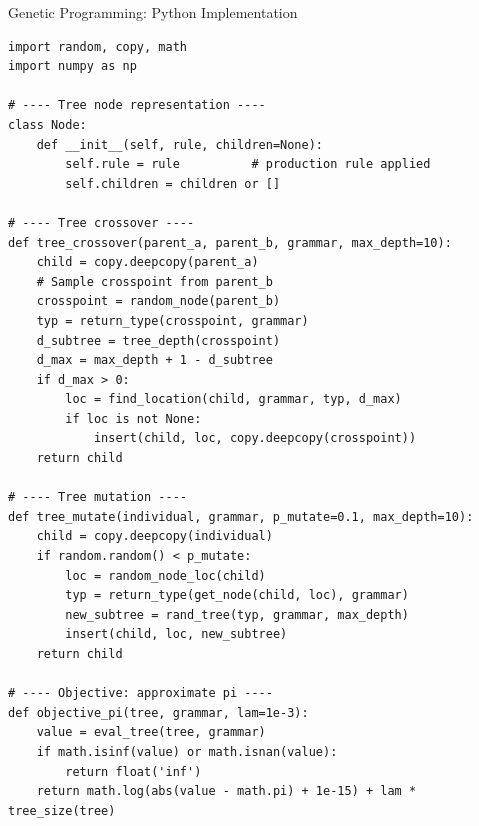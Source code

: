 \documentclass[aspectratio=169,10pt]{beamer}
\begin{document}
\begin{frame}[fragile]{Genetic Programming: Python Implementation}
\begin{lstlisting}[style=python]
import random, copy, math
import numpy as np

# ---- Tree node representation ----
class Node:
    def __init__(self, rule, children=None):
        self.rule = rule          # production rule applied
        self.children = children or []

# ---- Tree crossover ----
def tree_crossover(parent_a, parent_b, grammar, max_depth=10):
    child = copy.deepcopy(parent_a)
    # Sample crosspoint from parent_b
    crosspoint = random_node(parent_b)
    typ = return_type(crosspoint, grammar)
    d_subtree = tree_depth(crosspoint)
    d_max = max_depth + 1 - d_subtree
    if d_max > 0:
        loc = find_location(child, grammar, typ, d_max)
        if loc is not None:
            insert(child, loc, copy.deepcopy(crosspoint))
    return child

# ---- Tree mutation ----
def tree_mutate(individual, grammar, p_mutate=0.1, max_depth=10):
    child = copy.deepcopy(individual)
    if random.random() < p_mutate:
        loc = random_node_loc(child)
        typ = return_type(get_node(child, loc), grammar)
        new_subtree = rand_tree(typ, grammar, max_depth)
        insert(child, loc, new_subtree)
    return child

# ---- Objective: approximate pi ----
def objective_pi(tree, grammar, lam=1e-3):
    value = eval_tree(tree, grammar)
    if math.isinf(value) or math.isnan(value):
        return float('inf')
    return math.log(abs(value - math.pi) + 1e-15) + lam * tree_size(tree)
\end{lstlisting}
\end{frame}
\end{document}
